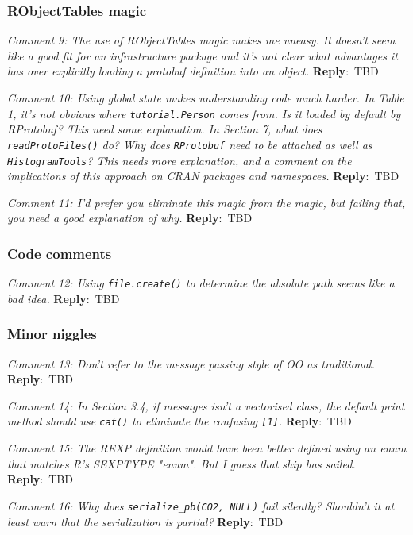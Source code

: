 \documentclass[10pt]{article}
\newcommand{\pointRaised}[2]{\smallskip %
  \textsl{{\fontseries{b}\selectfont #1}: #2}\newline}
\newcommand{\reply}[1]{\textbf{Reply}:\ #1 \smallskip } %
\begin{document}
\subsubsection*{RObjectTables magic}

\pointRaised{Comment 9}{The use of RObjectTables magic makes me uneasy. It doesn't seem like a
  good fit for an infrastructure package and it's not clear what
  advantages it has over explicitly loading a protobuf definition into
  an object.}
\reply{TBD}

\pointRaised{Comment 10}{Using global state makes understanding code much harder. In Table 1,
  it's not obvious where \texttt{tutorial.Person} comes from. Is it loaded by
  default by RProtobuf? This need some explanation. In Section 7, what
  does \texttt{readProtoFiles()} do? Why does \texttt{RProtobuf} need to be attached
  as well as \texttt{HistogramTools}? This needs more explanation, and a
  comment on the implications of this approach on CRAN packages and
  namespaces.}
\reply{TBD}

\pointRaised{Comment 11}{
  I'd prefer you eliminate this magic from the magic, but failing that,
  you need a good explanation of why.}
\reply{TBD}

\subsubsection*{Code comments}

\pointRaised{Comment 12}{Using \texttt{file.create()} to determine the absolute path seems like a bad idea.}
\reply{TBD}


\subsubsection*{Minor niggles}

\pointRaised{Comment 13}{Don't refer to the message passing style of OO as traditional.}
\reply{TBD}

\pointRaised{Comment 14}{In Section 3.4, if messages isn't a vectorised class, the default
   print method should use \texttt{cat()} to eliminate the confusing \texttt{[1]}.}
\reply{TBD}

\pointRaised{Comment 15}{The REXP definition would have been better defined using an enum that
   matches R's SEXPTYPE "enum". But I guess that ship has sailed.}
\reply{TBD}

\pointRaised{Comment 16}{Why does \texttt{serialize\_pb(CO2, NULL)} fail silently? Shouldn't it at least
   warn that the serialization is partial?}
\reply{TBD}
\end{document}
